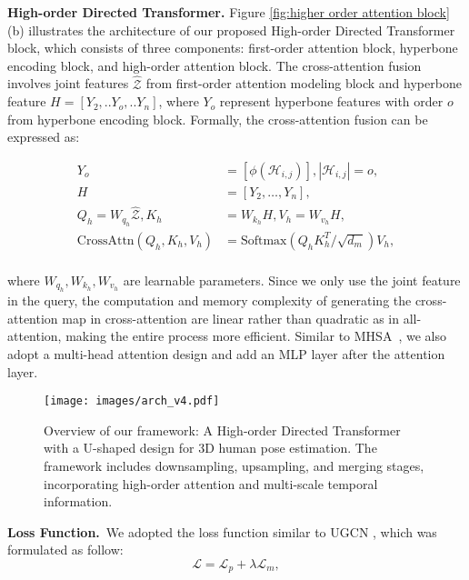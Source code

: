\documentclass{article}
\begin{document}
\noindent \textbf{High-order Directed Transformer.} Figure \ref{fig:higher order attention block}(b) illustrates the architecture of our proposed High-order Directed Transformer block, which consists of three components: first-order attention block, hyperbone encoding block, and high-order attention block. The cross-attention fusion involves joint features $ \hat{\mathcal{Z}}$ from first-order attention modeling block and hyperbone feature $H=[Y_{2},..Y_{o},..Y_{n}]$, where $Y_o$ represent hyperbone features with order $o$ from hyperbone encoding block. Formally, the cross-attention fusion can be expressed as:

\begin{equation}
\begin{aligned}
        Y_o &= [\phi(\mathcal{H}_{i,j})], |\mathcal{H}_{i,j}| = o, \\
        H &= [Y_2,\dots,Y_n], \\
        Q_h = W_{q_h}  \hat{\mathcal{Z}},
        K_h &= W_{k_h} H,
        V_h = W_{v_h} H, \\
        \text{CrossAttn}(Q_h,K_h,V_h) &= \text{Softmax}(Q_hK_{h}^T/\sqrt{d_m})V_{h}, \\
\end{aligned}
\end{equation}

\noindent where $W_{q_h}, W_{k_h}, W_{v_h}$ are learnable parameters. Since we only use the joint feature in the query, the computation and memory complexity of generating the cross-attention map in cross-attention are linear rather than quadratic as in all-attention, making the entire process more efficient. Similar to MHSA~\cite{vaswani2017attention}, we also adopt a multi-head attention design and add an MLP layer after the attention layer.

\begin{figure*}[!t]
    \centering
    \centerline{\texttt{[image: images/arch\_v4.pdf]}}
    \vspace{-2mm}
    \caption{\small Overview of our framework: A High-order Directed Transformer with a U-shaped design for 3D human pose estimation. The framework includes downsampling, upsampling, and merging stages, incorporating high-order attention and multi-scale temporal information.}
    \vspace{-2mm}
    \label{fig:arch}
\end{figure*}


\noindent \textbf{Loss Function.}~We adopted the loss function similar to UGCN \cite{wang2020-motion}, which was formulated as follow:
\begin{equation}
    \mathcal{L} = \mathcal{L}_p + \lambda \mathcal{L}_m,
\end{equation}
\end{document}
